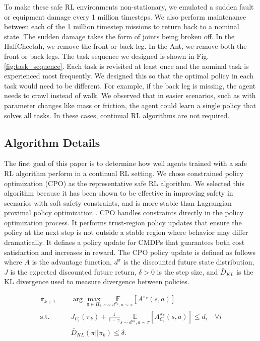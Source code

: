 To make these safe RL environments non-stationary, we emulated a sudden fault or equipment damage every 1 million timesteps. We also perform maintenance between each of the 1 million timestep missions to return back to a nominal state. The sudden damage takes the form of joints being broken off. In the HalfCheetah, we remove the front or back leg. In the Ant, we remove both the front or back legs. The task sequence we designed is shown in Fig. \ref{fig:task_sequence}. Each task is revisited at least once and the nominal task is experienced most frequently. We designed this so that the optimal policy in each task would need to be different. For example, if the back leg is missing, the agent needs to crawl instead of walk. We observed that in easier scenarios, such as with parameter changes like mass or friction, the agent could learn a single policy that solves all tasks. In these cases, continual RL algorithms are not required.


\subsection{Algorithm Details}

The first goal of this paper is to determine how well agents trained with a safe RL algorithm perform in a continual RL setting. We chose constrained policy optimization (CPO) \cite{achiam2017constrained} as the representative safe RL algorithm. We selected this algorithm because it has been shown to be effective in improving safety in scenarios with soft safety constraints, and is more stable than Lagrangian proximal policy optimization \cite{ji2023safety}. CPO handles constraints directly in the policy optimization process. It performs trust-region policy updates that ensure the policy at the next step is not outside a stable region where behavior may differ dramatically. It defines a policy update for CMDPs that guarantees both cost satisfaction and increases in reward. The CPO policy update is defined as follows \cite{achiam2017constrained} where $A$ is the advantage function, $d^\pi$ is the discounted future state distribution, $J$ is the expected discounted future return, $\delta > 0$ is the step size, and $\bar{D}_{KL}$ is the KL divergence used to measure divergence between policies. 

\begin{align*}
\pi_{k+1} =&\arg \max_{\pi \in \Pi_{\theta}} \underset{s \sim d^{\pi_k}, a \sim \pi}{\mathbb{E}} \left[ A^{\pi_k}(s, a) \right] \\
\text{s.t.} \quad &J_{C_i}(\pi_k) + \frac{1}{1 - \gamma} \underset{s \sim d^{\pi_k}, a \sim \pi}{\mathbb{E}} \left[ A^{\pi_k}_{C_i}(s, a) \right] \leq d_i \quad \forall i \\
&\bar{D}_{KL}(\pi || \pi_k) \leq \delta.
\end{align*}

